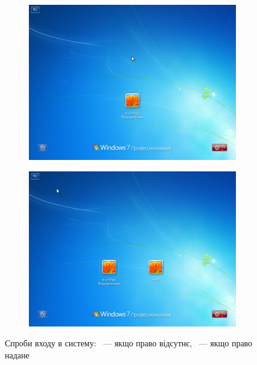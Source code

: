 \documentclass[
	a4paper,
	oneside,
	DIV = 12,
	fontsize = 13pt,
	headings = normal,
]{scrartcl}
\begin{document}
			\begin{figure}[!htbp]
				\begin{subfigure}[t]{0.5\columnwidth}
					\centering
					\includegraphics[height = 7\baselineskip]{../01-solution/y03s01-pcdiag-lab-08-p11-00.png}
					\caption{}
					\label{subfig:logon-attempt-access-denied}
				\end{subfigure}%
				\begin{subfigure}[t]{0.5\columnwidth}
					\centering
					\includegraphics[height = 7\baselineskip]{../01-solution/y03s01-pcdiag-lab-08-p11-01.png}
					\caption{}
					\label{subfig:logon-attempt-access-granted}
				\end{subfigure}%
				\caption{Спроби входу в систему: ~— якщо право відсутнє, ~— якщо право надане}
				\label{fig:logon-attempt}
			\end{figure}
\end{document}
